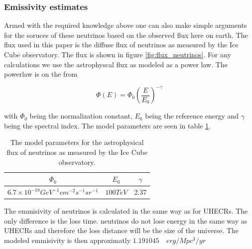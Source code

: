 \documentclass{article}
\begin{document}
\subsubsection{Emissivity estimates}
\label{sec:emmisivity_neutrinos}

Armed with the required knowledge above one can also make simple arguments for the soruces of these neutrinos based on the observed 
flux here on earth. The flux used in this paper is the diffuse flux of neutrinos as measured by the Ice Cube observatory. The flux is shown in figure \ref{fig:flux_neutrinos}. 
For any calculations we use the astrophyscal flux as modeled as a power law. The powerlaw is on the from 

\begin{equation}
    \Phi(E) = \Phi_0 \left(\frac{E}{E_0}\right)^{-\gamma}
\end{equation}

with $\Phi_0$ being the normalization constant, $E_0$ being the reference energy and $\gamma$ being the spectral index. The model parameters are seen in table \ref{tab:neutrino_flux}.

\begin{table}
    \centering
    \begin{tabular}{|c|c|c|}
        \hline
        $\Phi_0$ & $E_0$ & $\gamma$ \\
        \hline
        $6.7\times 10^{-18} GeV^{-1} cm^{-2} s^{-1} sr^{-1}$ & $100 TeV$ & 2.37 \\
        \hline
    \end{tabular}
    \caption{The model parameters for the astrophysical flux of neutrinos as measured by the Ice Cube observatory.}
    \label{tab:neutrino_flux}
\end{table}

The emmisivity of neutrinos is calculated in the same way as for UHECRs. The only difference is the loss time. neutrinos do not lose energy in the same way as UHECRs and therefore the loss distance will be the size of the universe. 
The modeled emmisivity is then approximatly $1.19 10{45} \quad erg/Mpc^3/yr$
\end{document}
